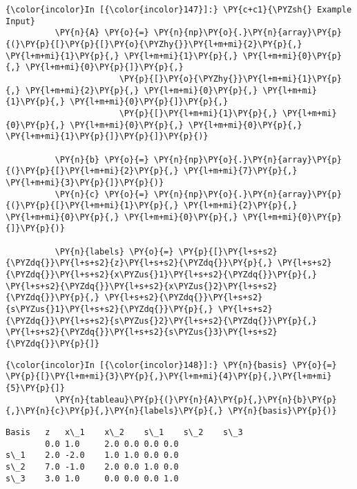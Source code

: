     \begin{Verbatim}[commandchars=\\\{\}]
{\color{incolor}In [{\color{incolor}147}]:} \PY{c+c1}{\PYZsh{} Example Input}
          \PY{n}{A} \PY{o}{=} \PY{n}{np}\PY{o}{.}\PY{n}{array}\PY{p}{(}\PY{p}{[}\PY{p}{[}\PY{o}{\PYZhy{}}\PY{l+m+mi}{2}\PY{p}{,} \PY{l+m+mi}{1}\PY{p}{,} \PY{l+m+mi}{1}\PY{p}{,} \PY{l+m+mi}{0}\PY{p}{,} \PY{l+m+mi}{0}\PY{p}{]}\PY{p}{,}
                       \PY{p}{[}\PY{o}{\PYZhy{}}\PY{l+m+mi}{1}\PY{p}{,} \PY{l+m+mi}{2}\PY{p}{,} \PY{l+m+mi}{0}\PY{p}{,} \PY{l+m+mi}{1}\PY{p}{,} \PY{l+m+mi}{0}\PY{p}{]}\PY{p}{,}
                       \PY{p}{[}\PY{l+m+mi}{1}\PY{p}{,} \PY{l+m+mi}{0}\PY{p}{,} \PY{l+m+mi}{0}\PY{p}{,} \PY{l+m+mi}{0}\PY{p}{,} \PY{l+m+mi}{1}\PY{p}{]}\PY{p}{]}\PY{p}{)}
          
          \PY{n}{b} \PY{o}{=} \PY{n}{np}\PY{o}{.}\PY{n}{array}\PY{p}{(}\PY{p}{[}\PY{l+m+mi}{2}\PY{p}{,} \PY{l+m+mi}{7}\PY{p}{,} \PY{l+m+mi}{3}\PY{p}{]}\PY{p}{)}
          \PY{n}{c} \PY{o}{=} \PY{n}{np}\PY{o}{.}\PY{n}{array}\PY{p}{(}\PY{p}{[}\PY{l+m+mi}{1}\PY{p}{,} \PY{l+m+mi}{2}\PY{p}{,} \PY{l+m+mi}{0}\PY{p}{,} \PY{l+m+mi}{0}\PY{p}{,} \PY{l+m+mi}{0}\PY{p}{]}\PY{p}{)}
          
          \PY{n}{labels} \PY{o}{=} \PY{p}{[}\PY{l+s+s2}{\PYZdq{}}\PY{l+s+s2}{z}\PY{l+s+s2}{\PYZdq{}}\PY{p}{,} \PY{l+s+s2}{\PYZdq{}}\PY{l+s+s2}{x\PYZus{}1}\PY{l+s+s2}{\PYZdq{}}\PY{p}{,} \PY{l+s+s2}{\PYZdq{}}\PY{l+s+s2}{x\PYZus{}2}\PY{l+s+s2}{\PYZdq{}}\PY{p}{,} \PY{l+s+s2}{\PYZdq{}}\PY{l+s+s2}{s\PYZus{}1}\PY{l+s+s2}{\PYZdq{}}\PY{p}{,} \PY{l+s+s2}{\PYZdq{}}\PY{l+s+s2}{s\PYZus{}2}\PY{l+s+s2}{\PYZdq{}}\PY{p}{,} \PY{l+s+s2}{\PYZdq{}}\PY{l+s+s2}{s\PYZus{}3}\PY{l+s+s2}{\PYZdq{}}\PY{p}{]}
\end{Verbatim}

    \begin{Verbatim}[commandchars=\\\{\}]
{\color{incolor}In [{\color{incolor}148}]:} \PY{n}{basis} \PY{o}{=} \PY{p}{[}\PY{l+m+mi}{3}\PY{p}{,}\PY{l+m+mi}{4}\PY{p}{,}\PY{l+m+mi}{5}\PY{p}{]}
          \PY{n}{tableau}\PY{p}{(}\PY{n}{A}\PY{p}{,}\PY{n}{b}\PY{p}{,}\PY{n}{c}\PY{p}{,}\PY{n}{labels}\PY{p}{,} \PY{n}{basis}\PY{p}{)}
\end{Verbatim}

    \begin{Verbatim}[commandchars=\\\{\}]
Basis	z  	x\_1 	x\_2	s\_1	s\_2	s\_3
     	0.0	1.0 	2.0	0.0	0.0	0.0
s\_1  	2.0	-2.0	1.0	1.0	0.0	0.0
s\_2  	7.0	-1.0	2.0	0.0	1.0	0.0
s\_3  	3.0	1.0 	0.0	0.0	0.0	1.0

    \end{Verbatim}

